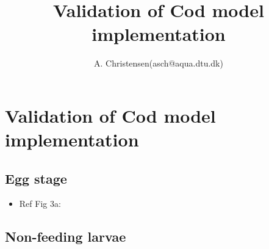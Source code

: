\documentclass[dvips,a4,graphicx]{article}          %
\title{Validation of Cod model implementation}    %
\author{A. Christensen(asch@aqua.dtu.dk)}           %
\begin{document}
\maketitle                                          %
\section{Validation of Cod model implementation}   
\subsection{Egg stage}   
\begin{itemize}
  \item Ref \cite{Daewel2011} Fig 3a:
\end{itemize}
\subsection{Non-feeding larvae}      
\end{document}
